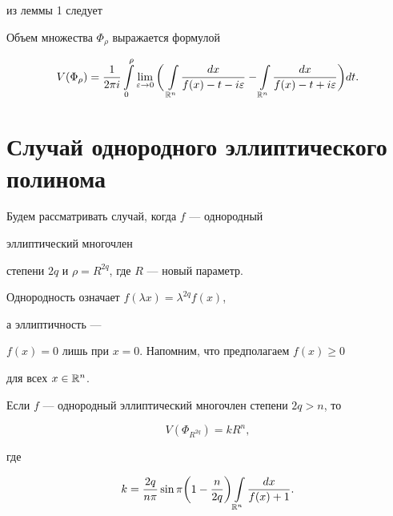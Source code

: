 из леммы 1 следует





\begin{lem}


Объем множества $\Phi_\rho$ выражается формулой


$$


V(\Phi_\rho)=\frac{1}{2\pi i}


\int\limits_0^\rho{\lim_{\varepsilon\to 0}


\bigg(\,\int\limits_{{\Bbb R}^n}{\frac {dx}{f(x)-t-i\varepsilon}}-


\int\limits_{{\Bbb R}^n}{\frac {dx}{f(x)-t+i\varepsilon}}\bigg )dt}.


$$


\end{lem}





\section{Случай однородного эллиптического полинома}





Будем рассматривать случай, когда $f$ --- однородный


эллиптический многочлен


степени $2q$ и $\rho=R^{2q}$, где $R$ --- новый параметр.





Однородность означает $f(\lambda x)={\lambda}^{2q}f(x)$,


а эллиптичность --- 


$f(x)=0$ лишь при $x=0$. Напомним, что предполагаем $f(x)\geqslant 0$


для всех $x\in {{\Bbb R}^n}$.





\begin{thm}


Если $f$ --- однородный эллиптический многочлен степени $2q>n$, то


\begin{equation}


V(\Phi_{R^{2q}})=kR^n,


\end{equation}


где


\begin{equation}


k=\frac{2q}{n\pi}\sin\pi\bigg (1-\frac{n}{2q}\bigg )


\int\limits_{{\Bbb R}^n}{\frac{dx}{f(x)+1}}.


\end{equation}


\end{thm}





